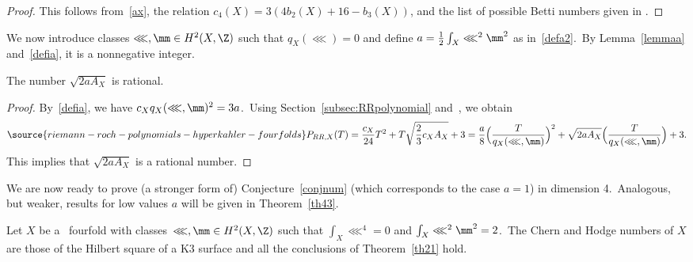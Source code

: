 \begin{proof}
This follows from~\eqref{ax}, the relation $c_4(X)=3(4b_2(X)+16-b_3(X))$, and the list of possible Betti numbers given in  \cite[Main Theorem]{gua}.
\end{proof}


We now introduce classes $\lll,\mm\in H^2(X,\Z)$ such that $q_X(\lll)=0$ and define $a=\frac12\int_X\lll^2\mm^2$ as in~\eqref{defa2}.\ By Lemma~\ref{lemmaa} and~\eqref{defia}, it is a  nonnegative integer.



\begin{lemm}\label{lemmax}
The number $\sqrt{2aA_X} $ is   rational.
\end{lemm}

\begin{proof}
By~\eqref{defia}, we have $c_Xq_X(\lll,\mm)^2=3a$.\ Using Section~\ref{subsec:RRpolynomial} and~\cite[Lemma~5.7]{jia}, we obtain
\begin{equation}\label{prr}
\source{riemann-roch-polynomials-hyperkahler-fourfolds}
   P_{RR,X}(T)=\frac{c_X}{24}T^2+ T\sqrt{\frac23c_XA_X} +3=\frac{a}{8}\Bigl(\frac{T}{q_X(\lll,\mm)}\Bigr)^2+ \sqrt{2aA_X}\Bigl(\frac{T}{q_X(\lll,\mm)}\Bigr) +3.
\end{equation}
This implies that $\sqrt{2aA_X} $ is a rational number.
\end{proof}

We are now ready to prove (a stronger form of) Conjecture~\ref{conjnum} (which corresponds to the case $a=1$) in dimension 4.\ Analogous, but weaker,  results for low values $a$ will be given in Theorem~\ref{th43}.

\begin{theo}\label{th43a}
Let $X$ be a  \hk\ fourfold with classes~$\lll,\mm\in H^2(X,\Z)$ such that $\int_X \lll^{4}=0$
and   $\int_X \lll^{2}\mm^{2}=2$.\
 The Chern and Hodge numbers of $X$ are those of the Hilbert square of a K3 surface  and all the  conclusions of Theorem~\ref{th21} hold.
\end{theo}

